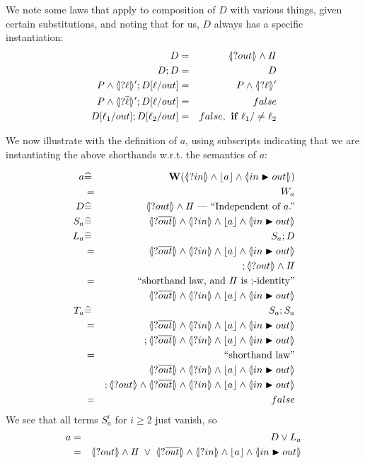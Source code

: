 We note some laws that apply to composition of $D$ with various
things, given certain substitutions, and noting that for us,
$D$ always has a specific instantiation:
\begin{eqnarray*}
   D &=& \LS{out} \land \Skip
\\ D ; D &= & D
\\ P \land \LSd{\ell} ; D[\ell/out] &=&  P \land \LSd{\ell}
\\ P \land \LSd{\B\ell} ; D[\ell/out] &=&  false
\\ D[\ell_1/out] ; D[\ell_2/out] &=& false,\textbf{ if }\ell_1/\neq\ell_2
\end{eqnarray*}

We now illustrate with the definition of $a$,
using subscripts indicating that we are instantiating the above shorthands
w.r.t. the semantics of $a$:

\begin{eqnarray*}
   a &\defs& \W( \LS{in} \land \ado a \land \LUPD{in}{out} )
\\ &=& W_a
\\ D &\defs& \D \EOLC{Independent of $a$.}
\\ S_a &\defs& \LS{\B{out}}
               \land \LS{in} \land \ado a \land \LUPD{in}{out}
\\ L_a &\defs& S_a ; D
\\ &=& \LS{\B{out}}
               \land \LS{in} \land \ado a \land \LUPD{in}{out}
\\ && {} ; \LS{out} \land \Skip
\EQ{shorthand law, and $\Skip$ is $;$-identity}
\\ && \LS{\B{out}}
               \land \LS{in} \land \ado a \land \LUPD{in}{out}
\\ T_a &\defs& S_a ; S_a
\\ &=& \LS{\B{out}}
               \land \LS{in} \land \ado a \land \LUPD{in}{out}
\\ && {} ; \LS{\B{out}}
               \land \LS{in} \land \ado a \land \LUPD{in}{out}
\EQ{shorthand law}
\\ && \LS{\B{out}}
               \land \LS{in} \land \ado a \land \LUPD{in}{out}
\\ && {} ; \LS{out} \land \LS{\B{out}}
               \land \LS{in} \land \ado a \land \LUPD{in}{out}
\\ &=& false
\end{eqnarray*}
We see that all terms $S_a^i$ for $i \geq 2$ just vanish, so
\begin{eqnarray*}
   a &=& D \lor L_a
\\ &=& \D \;\lor\; \LS{\B{out}}
               \land \LS{in} \land \ado a \land \LUPD{in}{out}
\end{eqnarray*}


